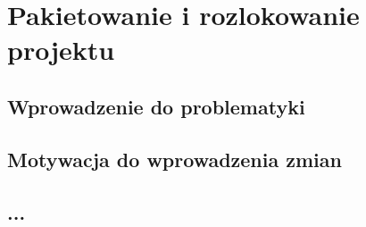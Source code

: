 \clearpage
\section{Pakietowanie i rozlokowanie projektu}
\label{ch:packages}

\subsection{Wprowadzenie do problematyki}

\subsection{Motywacja do wprowadzenia zmian}

\subsection{...}